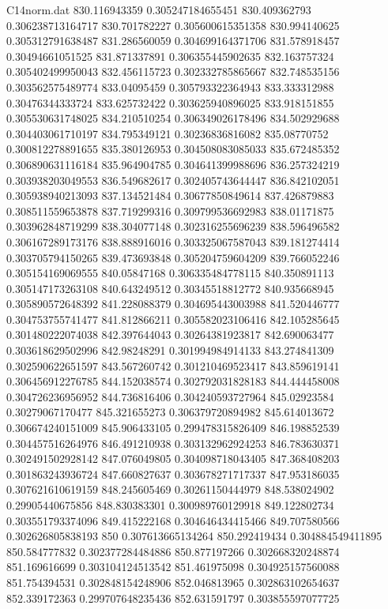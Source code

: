 \begin{filecontents}{C14norm.dat}
830.116943359			0.305247184655451
830.409362793			0.306238713164717
830.701782227			0.305600615351358
830.994140625			0.305312791638487
831.286560059			0.304699164371706
831.578918457			0.30494661051525
831.871337891			0.306355445902635
832.163757324			0.305402499950043
832.456115723			0.302332785865667
832.748535156			0.303562575489774
833.04095459			0.305793322364943
833.333312988			0.30476344333724
833.625732422			0.303625940896025
833.918151855			0.305530631748025
834.210510254			0.306349026178496
834.502929688			0.304403061710197
834.795349121			0.30236836816082
835.08770752			0.300812278891655
835.380126953			0.304508083085033
835.672485352			0.306890631116184
835.964904785			0.304641399988696
836.257324219			0.303938203049553
836.549682617			0.302405743644447
836.842102051			0.305938940213093
837.134521484			0.30677850849614
837.426879883			0.308511559653878
837.719299316			0.309799536692983
838.01171875			0.303962848719299
838.304077148			0.302316255696239
838.596496582			0.306167289173176
838.888916016			0.303325067587043
839.181274414			0.303705794150265
839.473693848			0.305204759604209
839.766052246			0.305154169069555
840.05847168			0.306335484778115
840.350891113			0.305147173263108
840.643249512			0.30345518812772
840.935668945			0.305890572648392
841.228088379			0.304695443003988
841.520446777			0.304753755741477
841.812866211			0.305582023106416
842.105285645			0.301480222074038
842.397644043			0.30264381923817
842.690063477			0.303618629502996
842.98248291			0.301994984914133
843.274841309			0.302590622651597
843.567260742			0.301210469523417
843.859619141			0.306456912276785
844.152038574			0.302792031828183
844.444458008			0.304726236956952
844.736816406			0.304240593727964
845.02923584			0.30279067170477
845.321655273			0.306379720894982
845.614013672			0.306674240151009
845.906433105			0.299478315826409
846.198852539			0.304457516264976
846.491210938			0.303132962924253
846.783630371			0.302491502928142
847.076049805			0.304098718043405
847.368408203			0.301863243936724
847.660827637			0.303678271717337
847.953186035			0.307621610619159
848.245605469			0.30261150444979
848.538024902			0.29905440675856
848.830383301			0.300989760129918
849.122802734			0.303551793374096
849.415222168			0.304646434415466
849.707580566			0.302626805838193
850			0.307613665134264
850.292419434			0.304884549411895
850.584777832			0.302377284484886
850.877197266			0.302668320248874
851.169616699			0.303104124513542
851.461975098			0.304925157560088
851.754394531			0.302848154248906
852.046813965			0.302863102654637
852.339172363			0.299707648235436
852.631591797			0.303855597077725

\end{filecontents}
